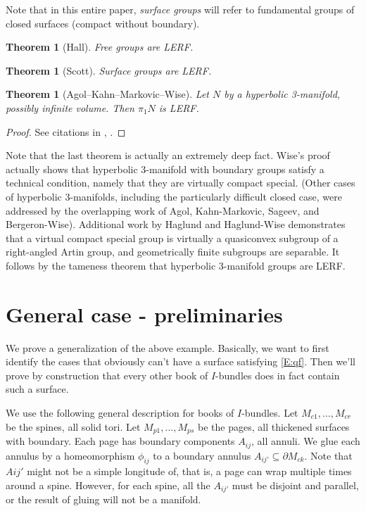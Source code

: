 \documentclass[12pt]{amsart}
\newtheorem{thm}[theorem]{Theorem}
\theoremstyle{definition}
\theoremstyle{remark}
\newcommand{\bd}{\partial}
\newcommand{\cin}{\subseteq}
\begin{document}
Note that in this entire paper, \emph{surface groups} will refer to fundamental
groups of closed surfaces (compact without boundary).

\begin{thm}[Hall] Free groups are LERF. \end{thm}

\begin{thm}[Scott] Surface groups are LERF. \end{thm}

\begin{thm}[Agol--Kahn--Markovic--Wise] Let $N$ by a hyperbolic 3-manifold,
possibly infinite volume.  Then $\pi_1N$ is LERF. \end{thm}

\begin{proof}

See citations in \cite{LR}, \cite{AFW}.

\end{proof}

Note that the last theorem is actually an extremely deep fact. Wise's proof
actually shows that hyperbolic 3-manifold with boundary groups satisfy
a technical condition, namely that they are virtually compact special. (Other
cases of hyperbolic 3-manifolds, including the particularly difficult closed
case, were addressed by the overlapping work of Agol, Kahn-Markovic, Sageev,
and Bergeron-Wise).  Additional work by Haglund and Haglund-Wise demonstrates
that a virtual compact special group is virtually a quasiconvex subgroup of
a right-angled Artin group, and geometrically finite subgroups are separable.
It follows by the tameness theorem that hyperbolic 3-manifold groups are LERF.


\section{General case - preliminaries}

We prove a generalization of the above example. Basically, we want to first
identify the cases that obviously can't have a surface satisfying \eqref{E:qf}.
Then we'll prove by construction that every other book of $I$-bundles does in
fact contain such a surface.

We use the following general description for books of $I$-bundles. Let
$M_{c1},...,M_{cr}$ be the spines, all solid tori. Let $M_{p1},...,M_{ps}$ be
the pages, all thickened surfaces with boundary. Each page has boundary
components $A_{ij}$, all annuli. We glue each annulus by a homeomorphism
$\phi_{ij}$ to a boundary annulus $A_{ij'}\cin \bd M_{ck}$. Note that $Aij'$
might not be a simple longitude of, that is, a page can wrap multiple times
around a spine.  However, for each spine, all the $A_{ij'}$ must be disjoint
and parallel, or the result of gluing will not be a manifold.
\end{document}
